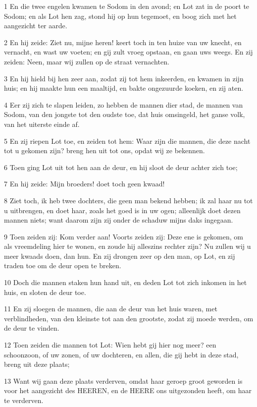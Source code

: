 \par 1 En die twee engelen kwamen te Sodom in den avond; en Lot zat in de poort te Sodom; en als Lot hen zag, stond hij op hun tegemoet, en boog zich met het aangezicht ter aarde.
\par 2 En hij zeide: Ziet nu, mijne heren! keert toch in ten huize van uw knecht, en vernacht, en wast uw voeten; en gij zult vroeg opstaan, en gaan uws weegs. En zij zeiden: Neen, maar wij zullen op de straat vernachten.
\par 3 En hij hield bij hen zeer aan, zodat zij tot hem inkeerden, en kwamen in zijn huis; en hij maakte hun een maaltijd, en bakte ongezuurde koeken, en zij aten.
\par 4 Eer zij zich te slapen leiden, zo hebben de mannen dier stad, de mannen van Sodom, van den jongste tot den oudste toe, dat huis omsingeld, het ganse volk, van het uiterste einde af.
\par 5 En zij riepen Lot toe, en zeiden tot hem: Waar zijn die mannen, die deze nacht tot u gekomen zijn? breng hen uit tot ons, opdat wij ze bekennen.
\par 6 Toen ging Lot uit tot hen aan de deur, en hij sloot de deur achter zich toe;
\par 7 En hij zeide: Mijn broeders! doet toch geen kwaad!
\par 8 Ziet toch, ik heb twee dochters, die geen man bekend hebben; ik zal haar nu tot u uitbrengen, en doet haar, zoals het goed is in uw ogen; alleenlijk doet dezen mannen niets; want daarom zijn zij onder de schaduw mijns daks ingegaan.
\par 9 Toen zeiden zij: Kom verder aan! Voorts zeiden zij: Deze ene is gekomen, om als vreemdeling hier te wonen, en zoude hij alleszins rechter zijn? Nu zullen wij u meer kwaads doen, dan hun. En zij drongen zeer op den man, op Lot, en zij traden toe om de deur open te breken.
\par 10 Doch die mannen staken hun hand uit, en deden Lot tot zich inkomen in het huis, en sloten de deur toe.
\par 11 En zij sloegen de mannen, die aan de deur van het huis waren, met verblindheden, van den kleinste tot aan den grootste, zodat zij moede werden, om de deur te vinden.
\par 12 Toen zeiden die mannen tot Lot: Wien hebt gij hier nog meer? een schoonzoon, of uw zonen, of uw dochteren, en allen, die gij hebt in deze stad, breng uit deze plaats;
\par 13 Want wij gaan deze plaats verderven, omdat haar geroep groot geworden is voor het aangezicht des HEEREN, en de HEERE ons uitgezonden heeft, om haar te verderven.
